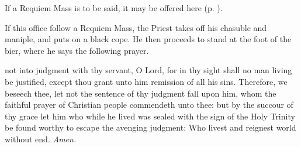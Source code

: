 \begin{rubric}
    If a Requiem Mass is to be said, it may be offered here (p. \pageref{RequiemMasses}).
\end{rubric}

\begin{rubric}
	If this office follow a Requiem Mass, the Priest takes off his chasuble and maniple, and puts on a black cope. He then proceeds to stand at the foot of the bier, where he says the following prayer.
\end{rubric}

 not into judgment with thy servant, O Lord, for in thy sight shall no man living be justified, except thou grant unto him remission of all his sins. Therefore, we beseech thee, let not the sentence of thy judgment fall upon him, whom the faithful prayer of Christian people commendeth unto thee: but by the succour of thy grace let him who while he lived was sealed with the sign of the Holy Trinity be found worthy to escape the avenging judgment: Who livest and reignest world without end. \textit{Amen.}


